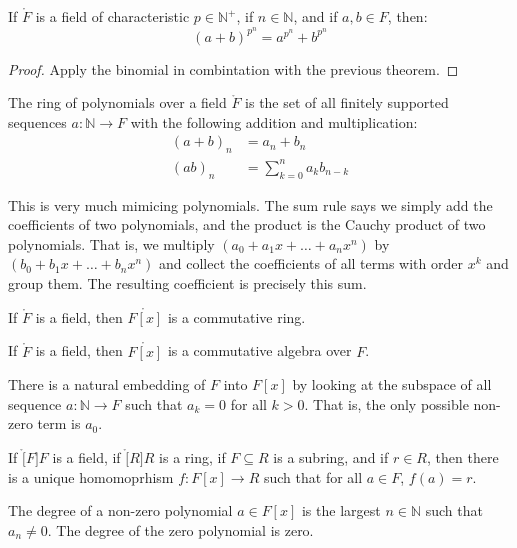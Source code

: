     \begin{theorem}
        If $\ring{F}$ is a field of characteristic $p\in\mathbb{N}^{+}$,
        if $n\in\mathbb{N}$, and if $a,b\in{F}$, then:
        \begin{equation}
            (a+b)^{p^{n}}=a^{p^{n}}+b^{p^{n}}
        \end{equation}
    \end{theorem}
    \begin{proof}
        Apply the binomial in combintation with the previous theorem.
    \end{proof}
    \begin{definition}
        The ring of polynomials over a field $\ring{F}$ is the set of all
        finitely supported sequences $a:\mathbb{N}\rightarrow{F}$ with the
        following addition and multiplication:
        \begin{align}
            (a+b)_{n}&=a_{n}+b_{n}\\
            (ab)_{n}&=\sum_{k=0}^{n}a_{k}b_{n-k}
        \end{align}
    \end{definition}
    This is very much mimicing polynomials. The sum rule says we simply add
    the coefficients of two polynomials, and the product is the Cauchy
    product of two polynomials. That is, we multiply
    $(a_{0}+a_{1}x+\dots+a_{n}x^{n})$ by $(b_{0}+b_{1}x+\dots+b_{n}x^{n})$
    and collect the coefficients of all terms with order $x^{k}$ and group
    them. The resulting coefficient is precisely this sum.
    \begin{theorem}
        If $\ring{F}$ is a field, then $\ring{F[x]}$ is a commutative ring.
    \end{theorem}
    \begin{theorem}
        If $\ring{F}$ is a field, then $\ring{F[x]}$ is a commutative
        algebra over $F$.
    \end{theorem}
    There is a natural embedding of $F$ into $F[x]$ by looking at the
    subspace of all sequence $a:\mathbb{N}\rightarrow{F}$ such that
    $a_{k}=0$ for all $k>0$. That is, the only possible non-zero term is
    $a_{0}$.
    \begin{theorem}
        If $\ring[F]{F}$ is a field, if $\ring[R]{R}$ is a ring, if
        $F\subseteq{R}$ is a subring, and if $r\in{R}$, then there is a
        unique homomoprhism $f:F[x]\rightarrow{R}$ such that for all
        $a\in{F}$, $f(a)=r$.
    \end{theorem}
    \begin{definition}
        The degree of a non-zero polynomial $a\in{F}[x]$ is the largest
        $n\in\mathbb{N}$ such that $a_{n}\ne{0}$. The degree of the zero
        polynomial is zero.
    \end{definition}

